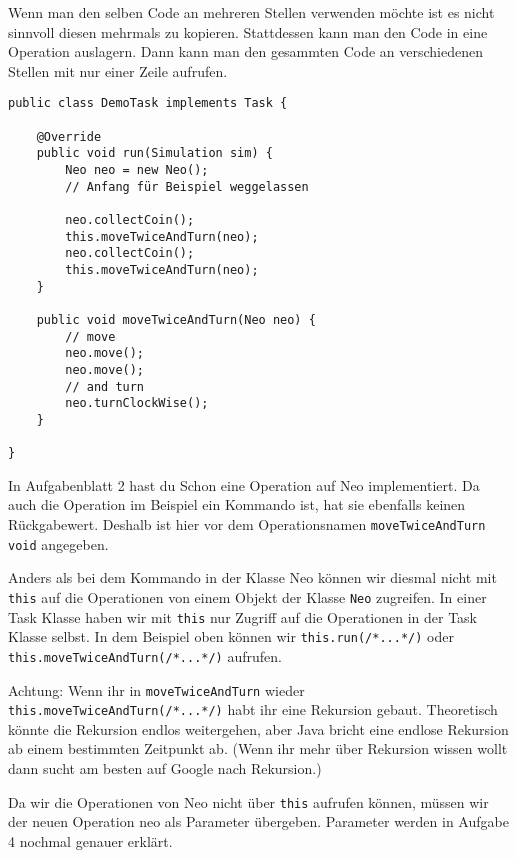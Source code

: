 \begin{Infobox}
	Wenn man den selben Code an mehreren Stellen verwenden möchte ist es nicht sinnvoll diesen mehrmals zu kopieren. 
	Stattdessen kann man den Code in eine Operation auslagern. 
	Dann kann man den gesammten Code an verschiedenen Stellen mit nur einer Zeile aufrufen.
	
	\begin{lstlisting}[xleftmargin=0.5cm]
public class DemoTask implements Task {
    
    @Override
    public void run(Simulation sim) {
        Neo neo = new Neo();
        // Anfang für Beispiel weggelassen
        
        neo.collectCoin();
        this.moveTwiceAndTurn(neo);
        neo.collectCoin();
        this.moveTwiceAndTurn(neo);
    }
    
    public void moveTwiceAndTurn(Neo neo) {
        // move
        neo.move();
        neo.move();
        // and turn
        neo.turnClockWise();
    }
    
}
	\end{lstlisting}

	In Aufgabenblatt 2 hast du Schon eine Operation auf Neo implementiert.
	Da auch die Operation im Beispiel ein Kommando ist, hat sie ebenfalls keinen Rückgabewert.
	Deshalb ist hier vor dem Operationsnamen \lstinline{moveTwiceAndTurn} \lstinline{void} angegeben.

	Anders als bei dem Kommando in der Klasse Neo können wir diesmal nicht mit \lstinline{this} auf die Operationen von einem Objekt der Klasse \lstinline{Neo} zugreifen.
	In einer Task Klasse haben wir mit \lstinline{this} nur Zugriff auf die Operationen in der Task Klasse selbst.
	In dem Beispiel oben können wir \lstinline{this.run(/*...*/)} oder \lstinline{this.moveTwiceAndTurn(/*...*/)} aufrufen.

	Achtung: Wenn ihr in \lstinline{moveTwiceAndTurn} wieder \lstinline{this.moveTwiceAndTurn(/*...*/)} habt ihr eine Rekursion gebaut.
	Theoretisch könnte die Rekursion endlos weitergehen, aber Java bricht eine endlose Rekursion ab einem bestimmten Zeitpunkt ab.
	(Wenn ihr mehr über Rekursion wissen wollt dann sucht am besten auf Google nach Rekursion.)

	Da wir die Operationen von Neo nicht über \lstinline{this} aufrufen können, müssen wir der neuen Operation neo als Parameter übergeben.
	Parameter werden in Aufgabe 4 nochmal genauer erklärt.
\end{Infobox}


